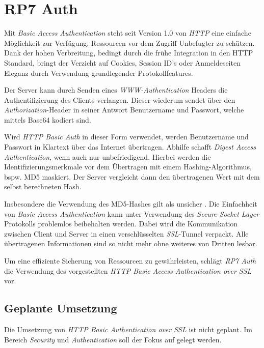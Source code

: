 \section{RP7 Auth}
\label{sec:principle-rp7-auth}


Mit \emph{Basic Access Authentication} \cite{HTTPBasicAuth} steht seit Version 1.0 von \emph{HTTP} eine einfache Möglichkeit zur Verfügung, Ressourcen vor dem Zugriff Unbefugter zu schützen. Dank der hohen Verbreitung, bedingt durch die frühe Integration in den HTTP Standard, bringt der Verzicht auf Cookies, Session ID's oder Anmeldeseiten Eleganz durch Verwendung grundlegender Protokollfeatures.

Der Server kann durch Senden eines \emph{WWW-Authentication} Headers die Authentifizierung des Clients verlangen. Dieser wiederum sendet über den \emph{Authorization}-Header in seiner Antwort Benutzername und Passwort, welche mittels Base64 \cite{Base64} kodiert sind.

Wird \emph{HTTP Basic Auth} in dieser Form verwendet, werden Benutzername und Passwort in Klartext über das Internet übertragen. Abhilfe schafft \emph{Digest Access Authentication}, wenn auch nur unbefriedigend. Hierbei werden die Identifizierungsmerkmale vor dem Übertragen mit einem Hashing-Algorithmus, bspw. MD5 maskiert. Der Server vergleicht dann den übertragenen Wert mit dem selbst berechneten Hash.

Insbesondere die Verwendung des MD5-Hashes gilt als unsicher \cite{MD5Broken}. Die Einfachheit von \emph{Basic Access Authentication} kann unter Verwendung des \emph{Secure Socket Layer} Protokolls \cite{SSL} problemlos beibehalten werden. Dabei wird die Kommunikation zwischen Client und Server in einen verschlüsselten \emph{\gls{SSL}}-Tunnel verpackt. Alle übertragenen Informationen sind so nicht mehr ohne weiteres von Dritten lesbar.

Um eine effiziente Sicherung von Ressourcen zu gewährleisten, schlägt \emph{RP7 Auth} die Verwendung des vorgestellten \emph{HTTP Basic Access Authentication over SSL} vor.


\subsection*{Geplante Umsetzung}

Die Umsetzung von \emph{HTTP Basic Authentication over SSL} ist nicht geplant. Im Bereich \emph{Security} und \emph{Authentication} soll der Fokus auf  gelegt werden.

